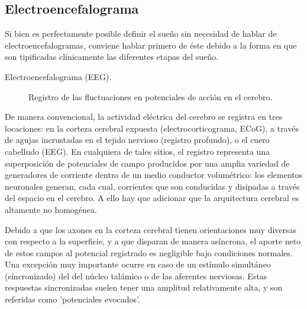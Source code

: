 \documentclass[12pt,a4paper]{mitthesis}
\begin{document}

\subsection{Electroencefalograma}

Si bien es perfectamente posible definir el sue\~no sin necesidad de hablar de 
electroencefalogramas, conviene hablar primero de \'este debido a la forma en que son tipificadas
cl\'inicamente las diferentes etapas del sue\~no.

\begin{description}
\item[Electroencefalograma (EEG).] Registro de las fluctuaciones en potenciales de acci\'on en el cerebro.
\end{description}

De manera convencional, la actividad el\'ectrica del cerebro se registra en tres locaciones: en la 
corteza cerebral expuesta (electrocorticograma, ECoG), a trav\'es de agujas incrustadas en el 
tejido nervioso (registro profundo), o el cuero cabelludo (EEG).
En cualquiera de tales sitios, el registro representa una superposici\'on de potenciales de campo 
producidos por una amplia variedad de generadores de corriente dentro de un medio conductor 
volum\'etrico: los elementos neuronales generan, cada cual, corrientes que son conducidas y 
disipadas a trav\'es del espacio en el cerebro.
A ello hay que adicionar que la arquitectura cerebral es altamente no homog\'enea.

Debido a que los axones en la corteza cerebral tienen orientaciones muy diversas con respecto a la 
superficie, y a que disparan de manera as\'incrona, el aporte neto de estos campos al potencial 
registrado es negligible bajo condiciones normales.
Una excepci\'on muy importante ocurre en caso de un est\'imulo simult\'aneo (s\'incronizado) del 
del n\'ucleo tal\'amico o de las aferentes nerviosas.
Estas respuestas sincronizadas suelen tener una amplitud relativamente alta, y son referidas como 
'potenciales evocados'.
\end{document}
